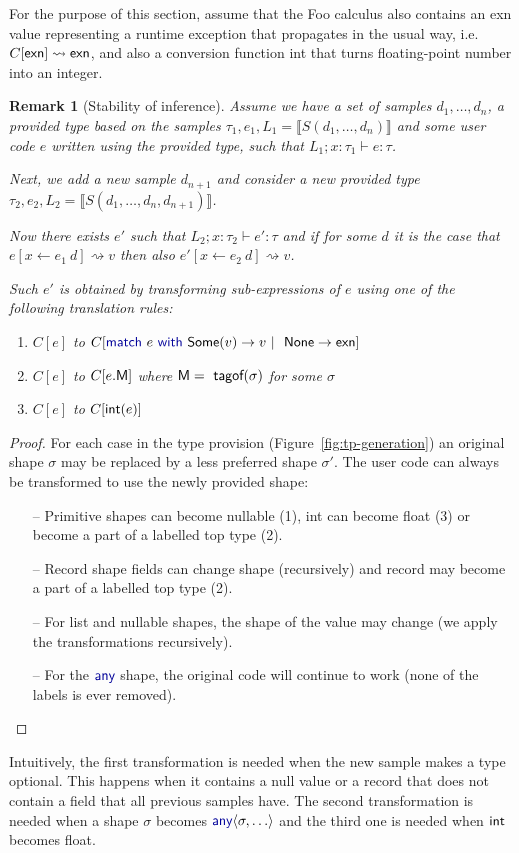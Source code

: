 \documentclass[10pt,nocopyrightspace]{sigplanconf}
\newcommand{\kvd}[1]{\textnormal{\textcolor{kvdclr}{\sffamily #1}}}
\newcommand{\ident}[1]{\textnormal{\sffamily #1}}
\newcommand{\tytagof}{\ident{tagof}}
\newcommand{\reduce}{\rightsquigarrow}
\newcommand{\sem}[1]{\llbracket #1 \rrbracket}
\newcommand{\semalt}[1]{S(#1)}
\newtheorem{remark}{Remark}
\begin{document}
For the purpose of this section, assume that the Foo calculus also contains an \ident{exn}
value representing a runtime exception that propagates in the usual way,
i.e.~$C[\ident{exn}]\reduce\ident{exn}$, and also a conversion function \ident{int} that
turns floating-point number into an integer.

\begin{remark}[Stability of inference]
Assume we have a set of samples $d_1, \ldots, d_n$, a provided type based on the samples
$\tau_1, e_1, L_1 = \sem{\semalt{d_1, \ldots, d_n}}$ and some user code $e$ written using
the provided type, such that $L_1; x:\tau_1\vdash e : \tau$.

Next, we add a new sample $d_{n+1}$ and consider a new provided type
$\tau_2, e_2, L_2 = \sem{\semalt{d_1, \ldots, d_n, d_{n+1}}}$.

Now there exists $e'$ such that $L_2; x:\tau_2\vdash e' : \tau$ and if
for some $d$ it is the case that $e[x\leftarrow e_1~d] \reduce v$ then
also $e'[x\leftarrow e_2~d] \reduce v$.

Such $e'$ is obtained by transforming sub-expressions of $e$ using one of the following
translation rules:
\begin{enumerate}
\item
$C[e]$ to $C[\kvd{match}~e~\kvd{with}~\ident{Some}(v) \rightarrow v~|~\ident{None} \rightarrow \ident{exn}]$
\item
$C[e]$ to $C[e.\ident{M}]$ where $\ident{M} = \tytagof(\sigma)$ for some $\sigma$
\item
$C[e]$ to $C[\ident{int}(e)]$
\end{enumerate}
\end{remark}

\begin{proof}
For each case in the type provision (Figure~\ref{fig:tp-generation}) an original shape $\sigma$
may be replaced by a less preferred shape $\sigma'$. The user code can always be transformed
to use the newly provided shape:

\begin{itemize}
\item[--] Primitive shapes can become nullable (1), \ident{int} can become \ident{float} (3)
  or become a part of a labelled top type (2).
\item[--] Record shape fields can change shape (recursively) and record may become a part
  of a labelled top type (2).
\item[--] For list and nullable shapes, the shape of the value may change (we apply the
  transformations recursively).
\item[--] For the $\kvd{any}$ shape, the original code will continue to work (none of the labels is ever removed).
\end{itemize}
\vspace{-1.5em}
\end{proof}
\noindent
Intuitively, the first transformation is needed when the new sample makes a type optional.
This happens when it contains a \kvd{null} value or a record that does not contain a field
that all previous samples have. The second transformation is needed when a shape $\sigma$
becomes $\kvd{any}\langle\sigma, \ldots\rangle$ and the third one is needed when $\ident{int}$
becomes \ident{float}.
\end{document}
